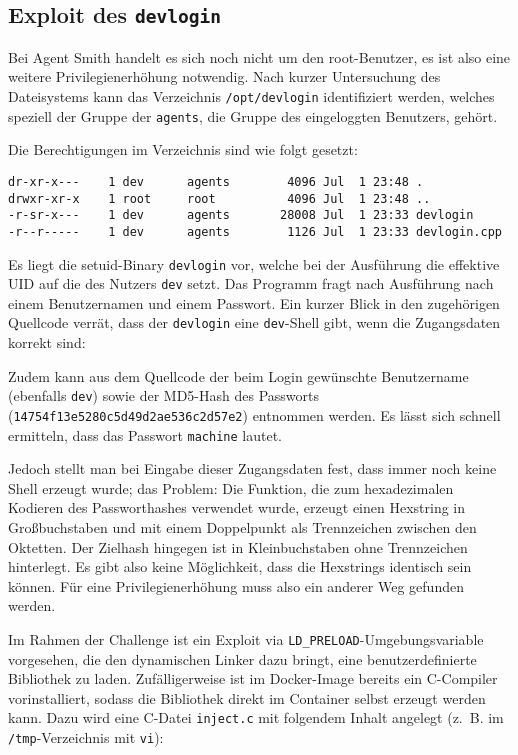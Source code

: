 \subsection{Exploit des \texttt{devlogin}}
Bei Agent Smith handelt es sich noch nicht um den root-Benutzer, es ist also eine weitere Privilegienerhöhung notwendig.
Nach kurzer Untersuchung des Dateisystems kann das Verzeichnis \texttt{/opt/devlogin} identifiziert werden, welches speziell der Gruppe der \texttt{agents}, die Gruppe des eingeloggten Benutzers, gehört.

Die Berechtigungen im Verzeichnis sind wie folgt gesetzt:
\begin{lstlisting}
dr-xr-x---    1 dev      agents        4096 Jul  1 23:48 .
drwxr-xr-x    1 root     root          4096 Jul  1 23:48 ..
-r-sr-x---    1 dev      agents       28008 Jul  1 23:33 devlogin
-r--r-----    1 dev      agents        1126 Jul  1 23:33 devlogin.cpp
\end{lstlisting}

Es liegt die setuid-Binary \texttt{devlogin} vor, welche bei der Ausführung die effektive UID auf die des Nutzers \texttt{dev} setzt.
Das Programm fragt nach Ausführung nach einem Benutzernamen und einem Passwort.
Ein kurzer Blick in den zugehörigen Quellcode verrät, dass der \texttt{devlogin} eine \texttt{dev}-Shell gibt, wenn die Zugangsdaten korrekt sind:


Zudem kann aus dem Quellcode der beim Login gewünschte Benutzername (ebenfalls \texttt{dev}) sowie der MD5-Hash des Passworts (\texttt{14754f13e5280c5d49d2ae536c2d57e2}) entnommen werden.
Es lässt sich schnell ermitteln, dass das Passwort \texttt{machine} lautet.

Jedoch stellt man bei Eingabe dieser Zugangsdaten fest, dass immer noch keine Shell erzeugt wurde; das Problem:
Die Funktion, die zum hexadezimalen Kodieren des Passworthashes verwendet wurde, erzeugt einen Hexstring in Großbuchstaben und mit einem Doppelpunkt als Trennzeichen zwischen den Oktetten.
Der Zielhash hingegen ist in Kleinbuchstaben ohne Trennzeichen hinterlegt.
Es gibt also keine Möglichkeit, dass die Hexstrings identisch sein können.
Für eine Privilegienerhöhung muss also ein anderer Weg gefunden werden.

Im Rahmen der Challenge ist ein Exploit via \texttt{LD\_PRELOAD}-Umgebungsvariable vorgesehen, die den dynamischen Linker dazu bringt, eine benutzerdefinierte Bibliothek zu laden.
Zufälligerweise ist im Docker-Image bereits ein C-Compiler vorinstalliert, sodass die Bibliothek direkt im Container selbst erzeugt werden kann.
Dazu wird eine C-Datei \texttt{inject.c} mit folgendem Inhalt angelegt (\hbox{z. B.} im \texttt{/tmp}-Verzeichnis mit \texttt{vi}):


